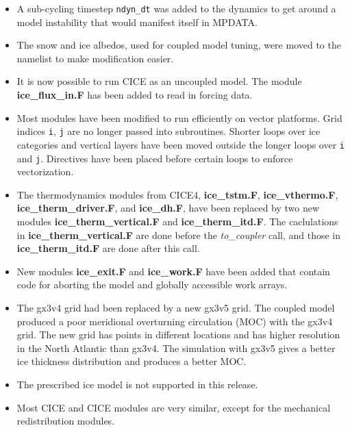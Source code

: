\begin{itemize}
\item A sub-cycling timestep {\tt ndyn\_dt} was added to the dynamics to get around
      a model instability that would manifest itself in MPDATA.

\item The snow and ice albedos, used for coupled model tuning, were moved to the
      namelist to make modification easier.

\item It is now possible to run CICE as an uncoupled model.  The module
      {\bf ice\_flux\_in.F} has been added to read in forcing data.

\item Most modules have been modified to run efficiently on vector platforms.
      Grid indices {\tt i}, {\tt j} are no longer passed into subroutines.  Shorter
      loops over ice categories and vertical layers have been moved outside
      the longer loops over {\tt i} and {\tt j}.  Directives have been placed
      before certain loops to enforce vectorization.

\item The thermodynamics modules from CICE4, {\bf ice\_tstm.F}, {\bf ice\_vthermo.F},
      {\bf ice\_therm\_driver.F}, and {\bf ice\_dh.F}, have been replaced by two new
      modules {\bf ice\_therm\_vertical.F} and {\bf ice\_therm\_itd.F}.  The caclulations
      in {\bf ice\_therm\_vertical.F} are done before the {\it to\_coupler} call,
      and those in {\bf ice\_therm\_itd.F} are done after this call.

\item New modules {\bf ice\_exit.F} and {\bf ice\_work.F} have been added that
      contain code for aborting the model and globally accessible work arrays.

\item The gx3v4 grid had been replaced by a new gx3v5 grid. The coupled model
      produced a poor meridional overturning circulation (MOC) with the gx3v4 grid.
      The new grid has points in different locations and has higher resolution
      in the North Atlantic than gx3v4.  The simulation with gx3v5 gives a better ice
      thickness distribution and produces a better MOC.

\item The prescribed ice model is not supported in this release.

\item Most CICE and CICE modules are very similar, except for the mechanical
      redistribution modules.

\end{itemize}

